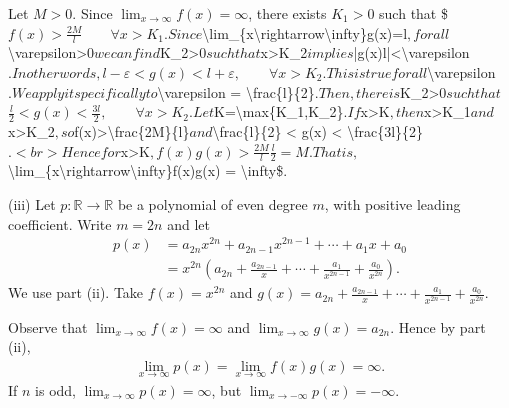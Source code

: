 \documentclass[letterpaper,10pt,english]{jupyterBook}
\begin{document}
Let \(M > 0\). Since \(\lim_{x\rightarrow\infty}f(x)=\infty\), there exists \(K_1 > 0\) such that
\$\(
f(x)>\frac{2M}{l} \hspace{2em} \forall x > K_1.
\)\(
Since \)\textbackslash{}lim\_\{x\textbackslash{}rightarrow\textbackslash{}infty\}g(x)=l\(, for all \)\textbackslash{}varepsilon>0\( we can find \)K\_2>0\( such that \)x>K\_2\( implies \)|g(x)\sphinxhyphen{}l|<\textbackslash{}varepsilon\(. In other words,
\)\(
l-\varepsilon < g(x) < l+\varepsilon, \hspace{2em} \forall x>K_2.
\)\(
This is true for all \)\textbackslash{}varepsilon\(. We apply it specifically to \)\textbackslash{}varepsilon = \textbackslash{}frac\{l\}\{2\}\(. Then, there is \)K\_2>0\( such that
\)\(
\frac{l}{2} < g(x) < \frac{3l}{2}, \hspace{2em} \forall x>K_2.
\)\(
Let \)K=\textbackslash{}max\{K\_1,K\_2\}\(. If \)x>K\(, then \)x>K\_1\( and \)x>K\_2\(, so \)f(x)>\textbackslash{}frac\{2M\}\{l\}\( and \)\textbackslash{}frac\{l\}\{2\} < g(x) < \textbackslash{}frac\{3l\}\{2\}\(.
<br>
Hence for \)x>K\(,
\)\(
f(x)g(x) > \frac{2M}{l}\frac{l}{2} = M.
\)\(
That is, \)\textbackslash{}lim\_\{x\textbackslash{}rightarrow\textbackslash{}infty\}f(x)g(x) = \textbackslash{}infty\$.

\sphinxAtStartPar
(iii) Let \(p:\mathbb{R}\to\mathbb{R}\) be a polynomial of even degree \(m\), with positive leading coefficient. Write \(m = 2n\) and let
\begin{align*}
p(x) &= a_{2n}x^{2n} + a_{2n-1}x^{2n-1} + \cdots + a_{1}x + a_{0}\\
&= x^{2n}\left(a_{2n} + \frac{a_{2n-1}}{x} + \cdots + \frac{a_{1}}{x^{2n-1}} + \frac{a_{0}}{x^{2n}}\right). 
\end{align*}
\sphinxAtStartPar
We use part (ii). Take \(f(x) = x^{2n}\) and \(\displaystyle g(x) = a_{2n} + \frac{a_{2n-1}}{x} + \cdots + \frac{a_{1}}{x^{2n-1}} + \frac{a_{0}}{x^{2n}}\).

Observe that \(\displaystyle\lim_{x \rightarrow \infty}f(x) = \infty\) and \(\displaystyle\lim_{x \rightarrow \infty}g(x) = a_{2n}\). Hence by part (ii),
\begin{equation*}
\begin{split}
\lim_{x \rightarrow \infty}p(x) = \lim_{x \rightarrow \infty}f(x)g(x) = \infty.
\end{split}
\end{equation*}
\sphinxAtStartPar
If \(n\) is odd, \(\lim_{x \rightarrow \infty}p(x) = \infty\), but \(\lim_{x \rightarrow -\infty}p(x) = -\infty\).
\end{document}
